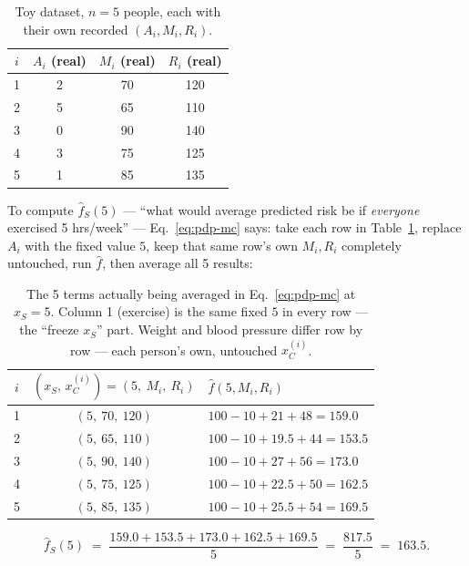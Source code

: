 \begin{table}[h]
\centering
\begin{tabular}{@{}cccc@{}}
\toprule
$i$ & $A_i$ (real) & $M_i$ (real) & $R_i$ (real) \\
\midrule
1 & 2 & 70 & 120 \\
2 & 5 & 65 & 110 \\
3 & 0 & 90 & 140 \\
4 & 3 & 75 & 125 \\
5 & 1 & 85 & 135 \\
\bottomrule
\end{tabular}
\caption{Toy dataset, $n=5$ people, each with their own recorded
$(A_i,M_i,R_i)$.}
\label{tab:pdp-toy}
\end{table}

To compute $\hat f_S(5)$ --- ``what would average predicted risk be if
\emph{everyone} exercised 5 hrs/week'' --- Eq.~\eqref{eq:pdp-mc} says: take
each row in Table~\ref{tab:pdp-toy}, replace $A_i$ with the fixed value
$5$, keep that same row's own $M_i,R_i$ completely untouched, run
$\hat f$, then average all 5 results:

\begin{table}[h]
\centering
\begin{tabular}{@{}ccl@{}}
\toprule
$i$ & $(x_S,\,x_C^{(i)}) = (5,\ M_i,\ R_i)$ & $\hat f(5,M_i,R_i)$ \\
\midrule
1 & $(5,\ 70,\ 120)$ & $100-10+21+48=159.0$ \\
2 & $(5,\ 65,\ 110)$ & $100-10+19.5+44=153.5$ \\
3 & $(5,\ 90,\ 140)$ & $100-10+27+56=173.0$ \\
4 & $(5,\ 75,\ 125)$ & $100-10+22.5+50=162.5$ \\
5 & $(5,\ 85,\ 135)$ & $100-10+25.5+54=169.5$ \\
\bottomrule
\end{tabular}
\caption{The 5 terms actually being averaged in Eq.~\eqref{eq:pdp-mc} at
$x_S=5$. Column 1 (exercise) is the same fixed $5$ in every row --- the
``freeze $x_S$'' part. Weight and blood pressure differ row by row ---
each person's own, untouched $x_C^{(i)}$.}
\label{tab:pdp-toy-eval}
\end{table}

$$\hat f_S(5) \;=\; \frac{159.0+153.5+173.0+162.5+169.5}{5}
\;=\; \frac{817.5}{5} \;=\; 163.5.$$


